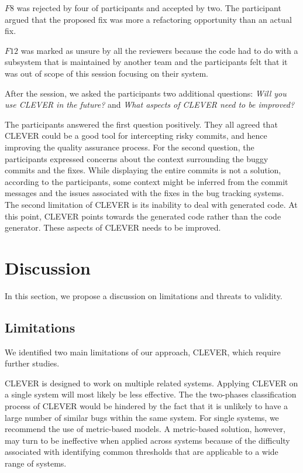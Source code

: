 \documentclass[sigconf]{acmart}
\begin{document}
\(F8\) was rejected by four of participants and accepted by two. The
participant argued that the proposed fix was more a refactoring
opportunity than an actual fix.

\(F12\) was marked as unsure by all the reviewers because the code had
to do with a subsystem that is maintained by another team and the
participants felt that it was out of scope of this session focusing on
their system.

After the session, we asked the participants two additional questions:
\emph{Will you use CLEVER in the future?} and \emph{What aspects of
CLEVER need to be improved?}

The participants answered the first question positively. They all agreed
that CLEVER could be a good tool for intercepting risky commits, and
hence improving the quality assurance process. For the second question,
the participants expressed concerns about the context surrounding the
buggy commits and the fixes. While displaying the entire commits is not
a solution, according to the participants, some context might be
inferred from the commit messages and the issues associated with the
fixes in the bug tracking systems. The second limitation of CLEVER is
its inability to deal with generated code. At this point, CLEVER points
towards the generated code rather than the code generator. These aspects
of CLEVER needs to be improved.

\section{Discussion}\label{sec:threats}

In this section, we propose a discussion on limitations and threats to
validity.

\subsection{Limitations}\label{limitations}

We identified two main limitations of our approach, CLEVER, which
require further studies.

CLEVER is designed to work on multiple related systems. Applying CLEVER
on a single system will most likely be less effective. The the
two-phases classification process of CLEVER would be hindered by the
fact that it is unlikely to have a large number of similar bugs within
the same system. For single systems, we recommend the use of
metric-based models. A metric-based solution, however, may turn to be
ineffective when applied across systems because of the difficulty
associated with identifying common thresholds that are applicable to a
wide range of systems.
\end{document}
